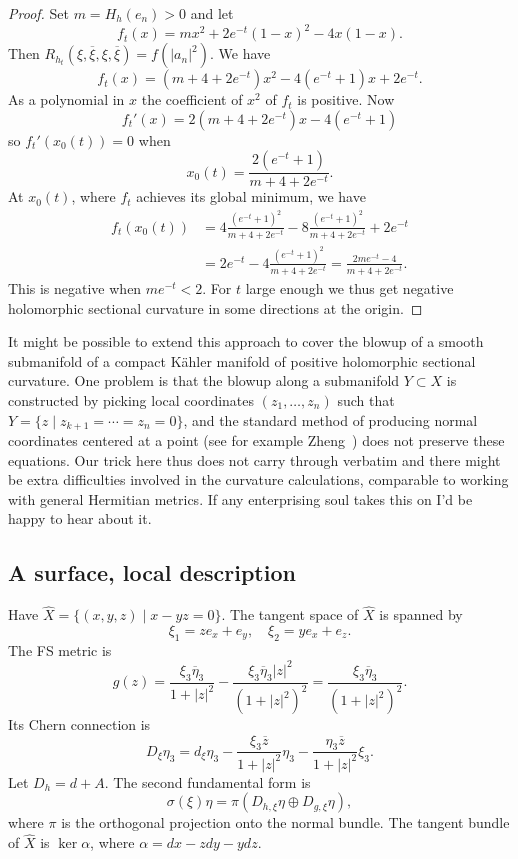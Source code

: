 \documentclass[10pt,a4paper]{amsart}
\def\ov#1{\overline{#1}}
\def\hsc{holomorphic sectional curvature}
\def\bl#1{\widehat{#1}}
\def\blX{\bl{X}}
\begin{document}
\begin{proof}
Set $m = H_h(e_n) > 0$ and let
$$
f_t(x) = m x^2 + 2 e^{-t} (1-x)^2 - 4x(1-x).
$$
Then $R_{h_t}(\xi, \ov\xi, \xi, \ov\xi) = f(|a_n|^2)$.
We have
$$
f_t(x)
= (m + 4 + 2e^{-t})x^2 - 4(e^{-t} + 1)x + 2e^{-t}.
$$
As a polynomial in $x$ the coefficient of $x^2$ of $f_t$ is positive.
Now
$$
f_t'(x)
= 2(m + 4 + 2e^{-t})x - 4(e^{-t} + 1)
$$
so $f_t'(x_0(t)) = 0$ when
$$
x_0(t) = \frac{2(e^{-t} + 1)}{m + 4 + 2e^{-t}}.
$$
At $x_0(t)$, where $f_t$ achieves its global minimum, we have
\begin{align*}
f_t(x_0(t))
&=
4 \frac{(e^{-t} + 1)^2}{m + 4 + 2e^{-t}}
- 8 \frac{(e^{-t} + 1)^2}{m + 4 + 2e^{-t}}
+ 2e^{-t}
\\
&= 2e^{-t}
- 4 \frac{(e^{-t} + 1)^2}{m + 4 + 2e^{-t}}
= \frac{2me^{-t} - 4}{m + 4 + 2e^{-t}}.
\end{align*}
This is negative when $me^{-t} < 2$.
For $t$ large enough we thus get negative \hsc{} in some directions at the origin.
\end{proof}




It might be possible to extend this approach to cover the blowup of a smooth
submanifold of a compact K\"ahler manifold of positive \hsc.
One problem
is that the blowup along a submanifold $Y \subset X$ is
constructed by picking local coordinates $(z_1,\ldots,z_n)$ such that $Y = \{z
\mid z_{k+1} = \cdots = z_n = 0\}$,
and the standard method of producing normal coordinates centered at a point
(see for example Zheng~\cite{zheng2000complex})
does not preserve these equations.
Our trick here thus does not carry through verbatim and there might be extra
difficulties involved in the curvature calculations, comparable to working
with general Hermitian metrics.
If any enterprising soul takes this on I'd be happy to hear about it.





\subsection*{A surface, local description}

Have $\blX = \{(x,y,z) \mid x - y z = 0\}$.
The tangent space of $\blX$ is spanned by
$$
\xi_1 = z e_x + e_y,
\quad
\xi_2 = y e_x + e_z.
$$
The FS metric is
$$
g(z)
= \frac{\xi_3 \ov\eta_3}{1 + |z|^2}
- \frac{\xi_3 \ov \eta_3 |z|^2}{(1 + |z|^2)^2}
= \frac{\xi_3 \ov\eta_3}{(1 + |z|^2)^2}.
$$
Its Chern connection is
$$
D_\xi \eta_3
= d_\xi \eta_3 - \frac{\xi_3 \ov z}{1 + |z|^2} \eta_3
- \frac{\eta_3 \ov z}{1 + |z|^2} \xi_3.
$$
Let $D_h = d + A$.
The second fundamental form is
$$
\sigma(\xi) \eta
= \pi(D_{h,\xi} \eta \oplus D_{g,\xi} \eta),
$$
where $\pi$ is the orthogonal projection onto the normal bundle.
The tangent bundle of $\blX$ is $\ker \alpha$, where
$\alpha = dx - z dy - y dz$.
\end{document}
